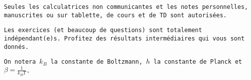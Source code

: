 \begin{tcolorbox}[
        colback=gray!20,
        colframe=gray!20,
        width=\dimexpr\textwidth\relax, 
        arc=0pt,outer arc=0pt,
        ]

\texttt{Seules les calculatrices non communicantes et les notes personnelles, manuscrites ou sur tablette,   de cours et de TD sont autorisées.}

\texttt{Les exercices (et beaucoup de questions) sont totalement indépendant(e)s. Profitez des résultats intermédiaires qui vous sont donnés.}

\texttt{On notera $k_B$ la constante de Boltzmann, $h$ la constante de Planck et $\beta=\frac{1}{k_B T}$.}

\end{tcolorbox}